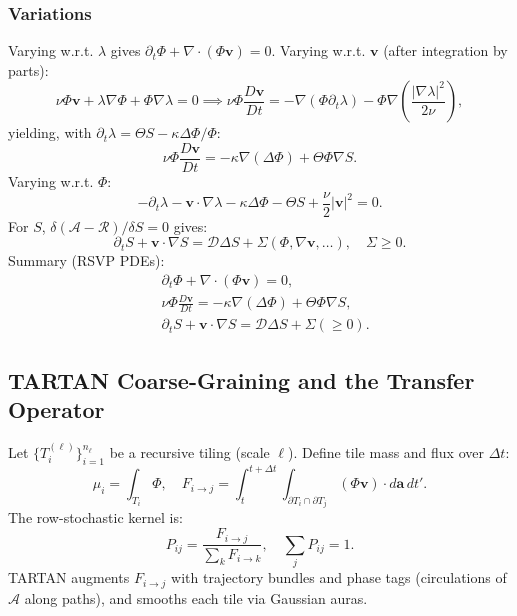 \documentclass[11pt]{article}
\theoremstyle{plain}
\theoremstyle{definition}
\begin{document}
\subsubsection{Variations}
Varying w.r.t. $\lambda$ gives $\partial_t \Phi + \nabla \cdot (\Phi \bm{v}) = 0$.
Varying w.r.t. $\bm{v}$ (after integration by parts):
\[
\nu \Phi \bm{v} + \lambda \nabla \Phi + \Phi \nabla \lambda = 0 \implies \nu \Phi \frac{D \bm{v}}{Dt} = -\nabla (\Phi \partial_t \lambda) - \Phi \nabla \left( \frac{|\nabla \lambda|^2}{2\nu} \right),
\]
yielding, with $\partial_t \lambda = \Theta S - \kappa \Delta \Phi / \Phi$:
\[
\nu \Phi \frac{D \bm{v}}{Dt} = -\kappa \nabla (\Delta \Phi) + \Theta \Phi \nabla S.
\]
Varying w.r.t. $\Phi$:
\[
-\partial_t \lambda - \bm{v} \cdot \nabla \lambda - \kappa \Delta \Phi - \Theta S + \frac{\nu}{2} |\bm{v}|^2 = 0.
\]
For $S$, $\delta (\mathcal{A} - \mathcal{R}) / \delta S = 0$ gives:
\[
\partial_t S + \bm{v} \cdot \nabla S = \mathcal{D} \Delta S + \Sigma (\Phi, \nabla \bm{v}, \dots), \quad \Sigma \geq 0.
\]
Summary (RSVP PDEs):
\[
\boxed{
\begin{aligned}
&\partial_t \Phi + \nabla \cdot (\Phi \bm{v}) = 0, \\
&\nu \Phi \frac{D \bm{v}}{Dt} = -\kappa \nabla (\Delta \Phi) + \Theta \Phi \nabla S, \\
&\partial_t S + \bm{v} \cdot \nabla S = \mathcal{D} \Delta S + \Sigma (\geq 0).
\end{aligned}
}
\]
\subsection{TARTAN Coarse-Graining and the Transfer Operator}
Let $\{T_i^{(\ell)}\}_{i=1}^{n_\ell}$ be a recursive tiling (scale $\ell$). Define tile mass and flux over $\Delta t$:
\[
\mu_i = \int_{T_i} \Phi, \quad F_{i \to j} = \int_t^{t+\Delta t} \int_{\partial T_i \cap \partial T_j} (\Phi \bm{v}) \cdot d\bm{a} \, dt'.
\]
The row-stochastic kernel is:
\[
P_{ij} = \frac{F_{i \to j}}{\sum_k F_{i \to k}}, \quad \sum_j P_{ij} = 1.
\]
TARTAN augments $F_{i \to j}$ with trajectory bundles and phase tags (circulations of $\mathcal{A}$ along paths), and smooths each tile via Gaussian auras.
\end{document}
